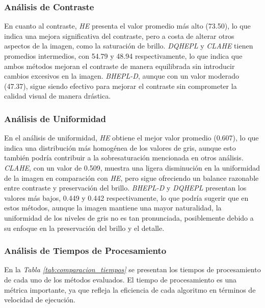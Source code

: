 \documentclass[sigchi]{acmart}
\begin{document}
\subsubsection{Análisis de Contraste}
\label{subsubsec:analisis_contraste}

En cuanto al contraste, \emph{HE} presenta el valor promedio más alto (73.50), lo que indica
una mejora significativa del contraste, pero a costa de alterar otros aspectos de la imagen,
como la saturación de brillo. \emph{DQHEPL} y \emph{CLAHE} tienen promedios intermedios,
con 54.79 y 48.94 respectivamente, lo que indica que ambos métodos mejoran el contraste de
manera equilibrada sin introducir cambios excesivos en la imagen. \emph{BHEPL-D}, aunque con
un valor moderado (47.37), sigue siendo efectivo para mejorar el contraste sin comprometer la
calidad visual de manera drástica.

\subsubsection{Análisis de Uniformidad}
\label{subsubsec:analisis_uniformidad}

En el análisis de uniformidad, \emph{HE} obtiene el mejor valor promedio (0.607), lo que
indica una distribución más homogénea de los valores de gris, aunque esto también podría
contribuir a la sobresaturación mencionada en otros análisis. \emph{CLAHE}, con un valor de
0.509, muestra una ligera disminución en la uniformidad de la imagen en comparación con
\emph{HE}, pero sigue ofreciendo un balance razonable entre contraste y preservación del
brillo. \emph{BHEPL-D} y \emph{DQHEPL} presentan los valores más bajos, 0.449 y 0.442
respectivamente, lo que podría sugerir que en estos métodos, aunque la imagen mantiene una
mayor naturalidad, la uniformidad de los niveles de gris no es tan pronunciada, posiblemente
debido a su enfoque en la preservación del brillo y el detalle.

\subsubsection{Análisis de Tiempos de Procesamiento}
\label{subsubsec:analisis_tiempos}

En la \emph{Tabla \ref{tab:comparacion_tiempos}} se presentan los tiempos de procesamiento de cada uno
de los métodos evaluados. El tiempo de procesamiento es una métrica importante, ya que refleja
la eficiencia de cada algoritmo en términos de velocidad de ejecución.
\end{document}
